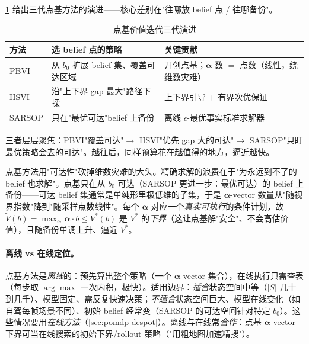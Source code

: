 \cref{tab:pomdp-pbvi} 给出三代点基方法的演进——核心差别在"往哪放 belief 点 / 往哪备份"。

\begin{table}[H]\centering\small
\caption{点基价值迭代三代演进}
\label{tab:pomdp-pbvi}
\begin{tabular}{lll}
\toprule
方法 & 选 belief 点的策略 & 关键贡献 \\
\midrule
PBVI\cite{pineau2003pbvi} & 从 $b_0$ 扩展 belief 集、覆盖可达区域 & 开创点基；$\boldsymbol{\alpha}$ 数 $=$ 点数（线性，绕维数灾难）\\
HSVI\cite{smith2004hsvi} & 沿"上下界 gap 最大"路径下探 & 上下界引导 + 有界次优保证 \\
SARSOP\cite{kurniawati2008sarsop} & 只在"最优可达"belief 上备份 & 离线 $\epsilon$-最优事实标准求解器 \\
\bottomrule
\end{tabular}
\end{table}

三者层层聚焦：PBVI"覆盖可达"$\to$ HSVI"优先 gap 大的可达"$\to$ SARSOP"只盯最优策略会去的可达"。越往后，同样预算花在越值得的地方，逼近越快。

\begin{insight}
点基方法用"可达性"砍掉维数灾难的大头。精确求解的浪费在于"为永远到不了的 belief 也求解"。点基只在从 $b_0$ 可达（SARSOP 更进一步：最优可达）的 belief 上备份——可达 belief 集通常是单纯形里极低维的子集，于是 $\boldsymbol{\alpha}$-vector 数量从"随视界指数"降到"随采样点数线性"。每个 $\boldsymbol{\alpha}$ 对应一个\emph{真实可执行}的条件计划，故 $\tilde V(b)=\max_{\boldsymbol{\alpha}}\boldsymbol{\alpha}\cdot b\le V^*(b)$ 是 $V^*$ 的\emph{下界}（这让点基解"安全"、不会高估价值），且随备份单调上升、逼近 $V^*$。
\end{insight}

\paragraph{离线 vs 在线定位。}
点基方法是\emph{离线}的：预先算出整个策略（一个 $\boldsymbol{\alpha}$-vector 集合），在线执行只需查表（每步取 $\arg\max$ 一次内积，极快）。适用边界：\emph{适合}状态空间中等（$|S|$ 几十到几千）、模型固定、需反复快速决策；\emph{不适合}状态空间巨大、模型在线变化（如自驾每帧场景不同）、初始 belief 经常变（SARSOP 的可达空间针对特定 $b_0$）。这些情况要用\emph{在线方法}（\cref{sec:pomdp-despot}）。离线与在线常\emph{合作}：点基 $\boldsymbol{\alpha}$-vector 下界可当在线搜索的初始下界/rollout 策略（"用粗地图加速精搜"）。

